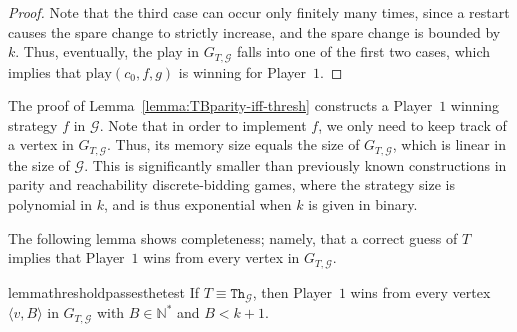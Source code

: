 \documentclass{article}\providecommand{\nequiv}{\not\equiv}\usepackage[a4paper,margin=20mm]{geometry}
\newcommand{\PO}{Player~$1$\xspace}
\newcommand{\G}{{\mathcal G}}
\newcommand{\Natstr}{\mathbb{N}^*}
\newcommand{\thresh}{\texttt{Th}\xspace}
\newcommand{\play}{\text{play}\xspace}
\newcommand{\zug}[1]{\langle #1  \rangle}
\begin{document}
\begin{proof}
	Note that the third case can occur only finitely many times, since a restart causes the spare change to strictly increase, and the spare change is bounded by $k$. Thus, eventually, the play in $G_{T, \G}$ falls into one of the first two cases, which implies that $\play(c_0, f, g)$ is winning for \PO. 	
\end{proof}

\begin{remark}
The proof of Lemma~\ref{lemma:TBparity-iff-thresh} constructs a \PO winning strategy $f$ in $\G$. Note that in order to implement $f$, we only need to keep track of a vertex in $G_{T, \G}$. Thus, its memory size equals the size of $G_{T, \G}$, which is linear in the size of $\G$. This is significantly smaller than previously known constructions in parity and reachability discrete-bidding games, where the strategy size is polynomial in $k$, and is thus exponential when $k$ is given in binary.
\end{remark}

The following lemma shows completeness; namely, that a correct guess of $T$ implies that \PO wins from every vertex in $G_{T, \G}$. 

\begin{restatable}{lemma}{thresholdpassesthetest}
	\label{lemma:thresholdpassesthetest}
	If $T \equiv \thresh_\G$, then \PO wins from every vertex $\zug{v, B}$ in $G_{T,\G}$ with $B \in \Natstr$ and $B < k+1$. 
\end{restatable}
\end{document}
